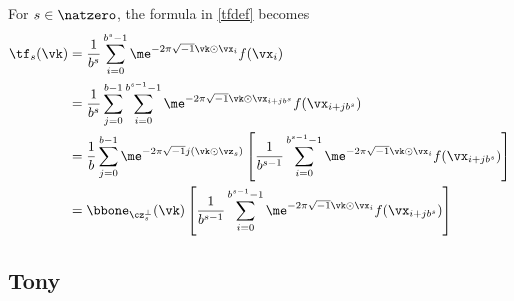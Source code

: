 \documentclass[]{elsarticle}
\theoremstyle{definition}
\theoremstyle{remark}
\begin{document}
For $s \in \natzero$, the formula in \eqref{tfdef} becomes
\begin{align*}
\tf_s(\vk) &= \frac{1}{b^s} \sum_{i=0}^{b^s-1} \me^{-2 \pi \sqrt{-1} \vk \odot \vx_i} f(\vx_i)\\
&= \frac{1}{b^s} \sum_{j=0}^{b-1} \sum_{i=0}^{b^{s-1}-1} \me^{-2 \pi \sqrt{-1} \vk \odot \vx_{i+jb^s}} f(\vx_{i+jb^s}) \\
&= \frac{1}{b} \sum_{j=0}^{b-1} \me^{-2 \pi \sqrt{-1} j (\vk \odot \vz_{s})} \left[ \frac{1}{b^{s-1}}\sum_{i=0}^{b^{s-1}-1} \me^{-2 \pi \sqrt{-1} \vk \odot \vx_{i}} f(\vx_{i+jb^s}) \right] \\
&= \bbone_{\cz_s^{\perp}}(\vk) \left[ \frac{1}{b^{s-1}}\sum_{i=0}^{b^{s-1}-1} \me^{-2 \pi \sqrt{-1} \vk \odot \vx_{i}} f(\vx_{i+jb^s}) \right] \\
\end{align*}

\subsection{Tony}
\end{document}

